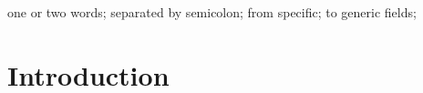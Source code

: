 \documentclass[10pt, conference]{IEEEtran}
\begin{document}
\maketitle


\begin{abstract}

%
\end{abstract}

\begin{IEEEkeywords}
one or two words; separated by semicolon; from specific; to generic fields;

\end{IEEEkeywords}


\IEEEpeerreviewmaketitle




\section{Introduction}
%
\end{document}
